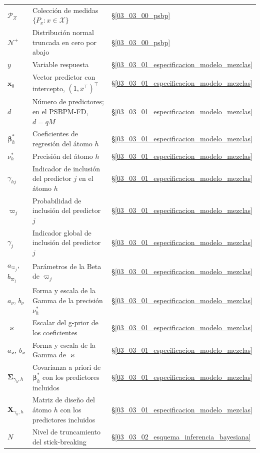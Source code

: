 \begin{longtable}{p{} p{} p{}}
$\mathcal{P}_{\mathcal{X}}$ & Colección de medidas $\{P_x : x \in \mathcal{X}\}$ & \S\ref{03_03_00_psbp} \\
$\mathcal{N}^{+}$ & Distribución normal truncada en cero por abajo & \S\ref{03_03_00_psbp} \\
$y$ & Variable respuesta & \S\ref{03_03_01_especificacion_modelo_mezclas} \\
$\mathbf{x}_0$ & Vector predictor con intercepto, $(1, x^\top)^\top$ & \S\ref{03_03_01_especificacion_modelo_mezclas} \\
$d$ & Número de predictores; en el PSBPM-FD, $d = qM$ & \S\ref{03_03_01_especificacion_modelo_mezclas} \\
$\boldsymbol{\beta}_h^*$ & Coeficientes de regresión del átomo $h$ & \S\ref{03_03_01_especificacion_modelo_mezclas} \\
$\nu_h^*$ & Precisión del átomo $h$ & \S\ref{03_03_01_especificacion_modelo_mezclas} \\
$\gamma_{hj}$ & Indicador de inclusión del predictor $j$ en el átomo $h$ & \S\ref{03_03_01_especificacion_modelo_mezclas} \\
$\varpi_j$ & Probabilidad de inclusión del predictor $j$ & \S\ref{03_03_01_especificacion_modelo_mezclas} \\
$\gamma_j$ & Indicador global de inclusión del predictor $j$ & \S\ref{03_03_01_especificacion_modelo_mezclas} \\
$a_{\varpi_j}$, $b_{\varpi_j}$ & Parámetros de la Beta de $\varpi_j$ & \S\ref{03_03_01_especificacion_modelo_mezclas} \\
$a_\nu$, $b_\nu$ & Forma y escala de la Gamma de la precisión $\nu_h^*$ & \S\ref{03_03_01_especificacion_modelo_mezclas} \\
$\varkappa$ & Escalar del g-prior de los coeficientes & \S\ref{03_03_01_especificacion_modelo_mezclas} \\
$a_\varkappa$, $b_\varkappa$ & Forma y escala de la Gamma de $\varkappa$ & \S\ref{03_03_01_especificacion_modelo_mezclas} \\
$\boldsymbol{\Sigma}_{\gamma_h,h}$ & Covarianza a priori de $\boldsymbol{\beta}_h^*$ con los predictores incluidos & \S\ref{03_03_01_especificacion_modelo_mezclas} \\
$\mathbf{X}_{\gamma_h,h}$ & Matriz de diseño del átomo $h$ con los predictores incluidos & \S\ref{03_03_01_especificacion_modelo_mezclas} \\
$N$ & Nivel de truncamiento del stick-breaking & \S\ref{03_03_02_esquema_inferencia_bayesiana} \\

\end{longtable}
